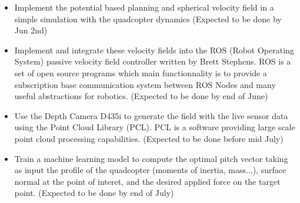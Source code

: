 \begin{itemize}
    \item Implement the potential based planning and spherical velocity field in a simple simulation with the quadcopter dynamics (Expected to be done by Jun 2nd)
    \item Implement and integrate these velocity fields into the ROS (Robot Operating System) passive velocity field controller written by Brett Stephens. ROS is a set of open source programs which main functionnality is to provide a subscription base communication system between ROS Nodes and many useful abstractions for robotics. (Expected to be done by end of June)
    \item Use the Depth Camera D435i to generate the field with the live sensor data using the Point Cloud Library \cite{rusu20113d} (PCL). PCL is a software providing large scale point cloud processing capabilities. (Expected to be done before mid July)
    \item Train a machine learning model to compute the optimal pitch vector taking as input the profile of the quadcopter (moments of inertia, mass...), surface normal at the point of interet,  and the desired applied force on the target point. (Expected to be done by end of July)
 
\end{itemize}